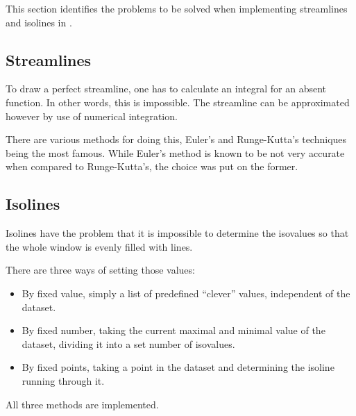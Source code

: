 
This section identifies the problems to be solved when implementing streamlines
and isolines in \fluids{}.

\subsection{Streamlines}

To draw a perfect streamline, one has to calculate an integral for an absent
function. In other words, this is impossible. The streamline can be
approximated however by use of numerical integration. 

There are various methods for doing this, Euler's and Runge-Kutta's techniques
being the most famous. While Euler's method is known to be not very accurate
when compared to Runge-Kutta's, the choice was put on the former.

\subsection{Isolines}

Isolines have the problem that it is impossible to determine the isovalues so
that the whole window is evenly filled with lines.

There are three ways of setting those values:

\begin{itemize}

\item By fixed value, simply a list of predefined ``clever'' values,
independent of the dataset.

\item By fixed number, taking the current maximal and minimal value of the
dataset, dividing it into a set number of isovalues.

\item By fixed points, taking a point in the dataset and determining the
isoline running through it.

\end{itemize}

All three methods are implemented.

